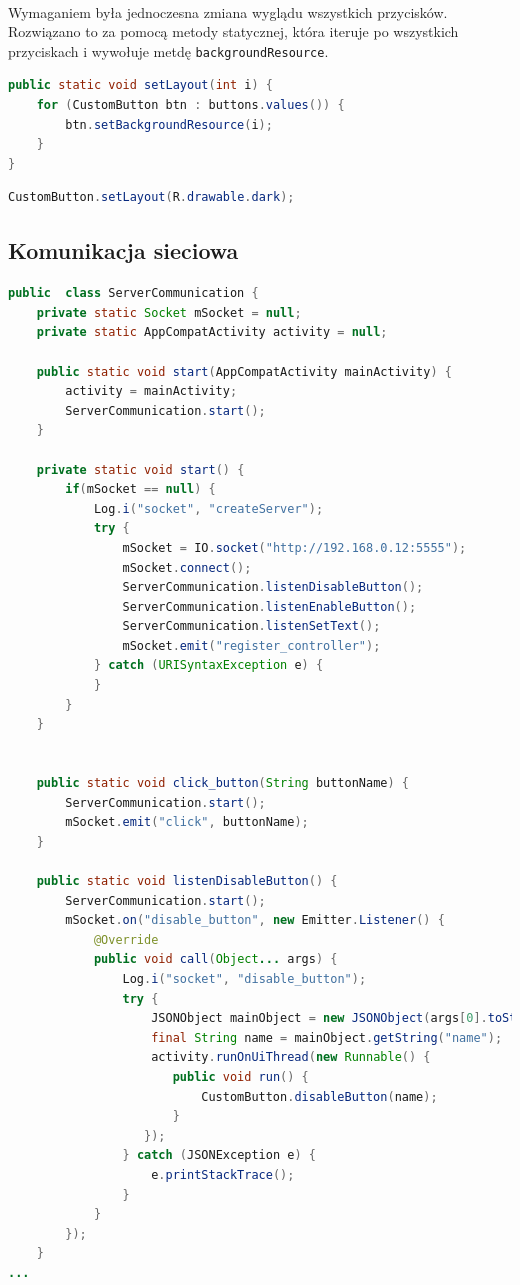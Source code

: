 \paragraph{}
Wymaganiem była jednoczesna zmiana wyglądu wszystkich przycisków. Rozwiązano to za pomocą metody statycznej, która iteruje po wszystkich przyciskach i wywołuje metdę \texttt{backgroundResource}.


\begin{lstlisting}[language=Java]
 public static void setLayout(int i) {
    for (CustomButton btn : buttons.values()) {
        btn.setBackgroundResource(i);
    }
}
\end{lstlisting}


\begin{lstlisting}[language=Java]
CustomButton.setLayout(R.drawable.dark);
\end{lstlisting}

\subsection{Komunikacja sieciowa}

\begin{lstlisting}[language=Java]
public  class ServerCommunication {
    private static Socket mSocket = null;
    private static AppCompatActivity activity = null;

    public static void start(AppCompatActivity mainActivity) {
        activity = mainActivity;
        ServerCommunication.start();
    }

    private static void start() {
        if(mSocket == null) {
            Log.i("socket", "createServer");
            try {
                mSocket = IO.socket("http://192.168.0.12:5555");
                mSocket.connect();
                ServerCommunication.listenDisableButton();
                ServerCommunication.listenEnableButton();
                ServerCommunication.listenSetText();
                mSocket.emit("register_controller");
            } catch (URISyntaxException e) {
            }
        }
    }


    public static void click_button(String buttonName) {
        ServerCommunication.start();
        mSocket.emit("click", buttonName);
    }

    public static void listenDisableButton() {
        ServerCommunication.start();
        mSocket.on("disable_button", new Emitter.Listener() {
            @Override
            public void call(Object... args) {
                Log.i("socket", "disable_button");
                try {
                    JSONObject mainObject = new JSONObject(args[0].toString());
                    final String name = mainObject.getString("name");
                    activity.runOnUiThread(new Runnable() {
                       public void run() {
                           CustomButton.disableButton(name);
                       }
                   });
                } catch (JSONException e) {
                    e.printStackTrace();
                }
            }
        });
    }
...
\end{lstlisting}
